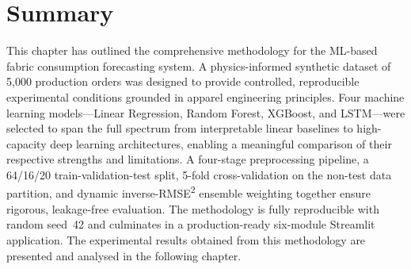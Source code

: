 \section{Summary}
This chapter has outlined the comprehensive methodology for the ML-based fabric consumption forecasting system. A physics-informed synthetic dataset of 5{,}000 production orders was designed to provide controlled, reproducible experimental conditions grounded in apparel engineering principles. Four machine learning models---Linear Regression, Random Forest, XGBoost, and LSTM---were selected to span the full spectrum from interpretable linear baselines to high-capacity deep learning architectures, enabling a meaningful comparison of their respective strengths and limitations. A four-stage preprocessing pipeline, a 64/16/20 train-validation-test split, 5-fold cross-validation on the non-test data partition, and dynamic inverse-RMSE\textsuperscript{2} ensemble weighting together ensure rigorous, leakage-free evaluation. The methodology is fully reproducible with random seed~42 and culminates in a production-ready six-module Streamlit application. The experimental results obtained from this methodology are presented and analysed in the following chapter.
